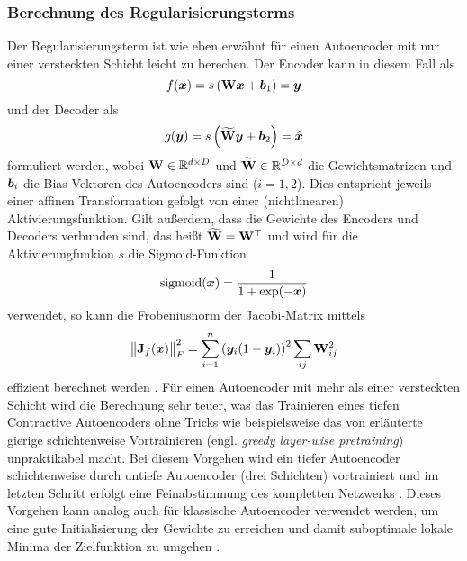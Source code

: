 \subsubsection{Berechnung des Regularisierungsterms}
\label{ch:MethodenDerDimRed:ML:CAE:BerechnungRegTerm}
Der Regularisierungsterm ist wie eben erwähnt für einen Autoencoder mit nur einer versteckten Schicht leicht zu berechen. Der Encoder
kann in diesem Fall als
\begin{equation}
	f(\vect{x}) = s \left( \mat{W} \vect{x} + \vect{b}_1 \right) = \vect{y}
\end{equation}
und der Decoder als
\begin{equation}
	g(\vect{y}) = s \left( \mat{\widetilde{W}} \vect{y} + \vect{b}_2 \right) = \estNormal{\vect{x}}
\end{equation}
formuliert werden, wobei $\mat{W} \in \real^{d \times D}$ und $\mat{\widetilde{W}} \in \real^{D \times d}$ die Gewichtsmatrizen und $\vect{b}_i$ die Bias-Vektoren des Autoencoders sind ($i = 1, 2$). Dies entspricht jeweils einer affinen Transformation gefolgt von einer (nichtlinearen) Aktivierungsfunktion. Gilt außerdem, dass die Gewichte des Encoders und Decoders verbunden sind, das heißt $\mat{\widetilde{W}} = \tr{\mat{W}}$ und wird für die Aktivierungfunkion $s$ die Sigmoid-Funktion
\begin{equation}
	\operatorname{sigmoid}(\vect{x}) = \frac{1}{1 + \exp (-\vect{x})}
\end{equation}
verwendet, so kann die Frobeniusnorm der Jacobi-Matrix mittels
\begin{equation}
	\norm[\big]{\mat{J}_f(\vect{x})}_F^2 = \sum_{i = 1}^n \left( \vect{y}_i (1 - \vect{y}_i)\right)^2 \sum_{ij} \mat{W}^2_{ij}
\end{equation}
effizient berechnet werden \parencite[4]{Rifai.2011}. Für einen Autoencoder mit mehr als einer versteckten Schicht wird die
Berechnung sehr teuer, was das Trainieren eines tiefen Contractive Autoencoders ohne Tricks wie
beispielsweise das von \textcite{Bengio.2006} erläuterte gierige schichtenweise Vortrainieren
(engl. \textit{greedy layer-wise pretraining}) unpraktikabel macht. Bei diesem Vorgehen wird ein
tiefer Autoencoder schichtenweise durch untiefe Autoencoder (drei Schichten) vortrainiert und im
letzten Schritt erfolgt eine Feinabstimmung des kompletten Netzwerks \parencite[522]{Goodfellow.2016}. Dieses Vorgehen kann analog auch für klassische Autoencoder verwendet
werden, um eine gute Initialisierung der Gewichte zu erreichen und damit suboptimale lokale Minima
der Zielfunktion zu umgehen \parencite[509]{Goodfellow.2016}.